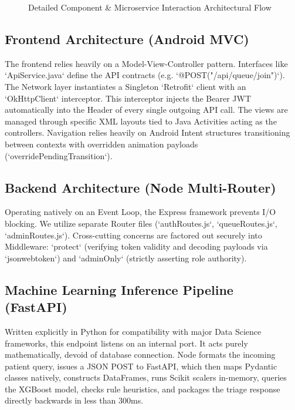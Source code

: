 \documentclass[12pt,a4paper]{article}
\begin{document}
\begin{figure}[H]
\caption{Detailed Component \& Microservice Interaction Architectural Flow}
\label{fig:detailed_arch}
\end{figure}

\subsection{Frontend Architecture (Android MVC)}
The frontend relies heavily on a Model-View-Controller pattern. Interfaces like `ApiService.java` define the API contracts (e.g. `@POST("/api/queue/join")`). The Network layer instantiates a Singleton `Retrofit` client with an `OkHttpClient` interceptor. This interceptor injects the Bearer JWT automatically into the Header of every single outgoing API call. The views are managed through specific XML layouts tied to Java Activities acting as the controllers. Navigation relies heavily on Android Intent structures transitioning between contexts with overridden animation payloads (`overridePendingTransition`).

\subsection{Backend Architecture (Node Multi-Router)}
Operating natively on an Event Loop, the Express framework prevents I/O blocking. We utilize separate Router files (`authRoutes.js`, `queueRoutes.js`, `adminRoutes.js`). Cross-cutting concerns are factored out securely into Middleware: `protect` (verifying token validity and decoding payloads via `jsonwebtoken`) and `adminOnly` (strictly asserting role authority).

\subsection{Machine Learning Inference Pipeline (FastAPI)}
Written explicitly in Python for compatibility with major Data Science frameworks, this endpoint listens on an internal port. It acts purely mathematically, devoid of database connection. Node formats the incoming patient query, issues a JSON POST to FastAPI, which then maps Pydantic classes natively, constructs DataFrames, runs Scikit scalers in-memory, queries the XGBoost model, checks rule heuristics, and packages the triage response directly backwards in less than 300ms.
\end{document}
